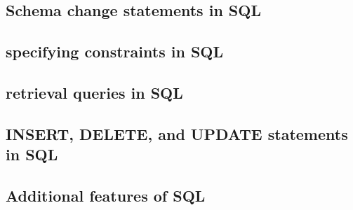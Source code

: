 \documentclass{article}
\begin{document}
	\subsection{Schema change statements in SQL}
	\subsection{specifying constraints in SQL}
	\subsection{retrieval queries in SQL}
	\subsection{INSERT, DELETE, and UPDATE statements in SQL}
	\subsection{Additional features of SQL}
\end{document}
